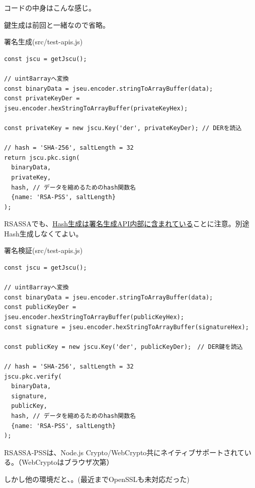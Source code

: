 \documentclass[12pt,dvipdfmx]{beamer}
\begin{document}
\begin{frame}[fragile]
コードの中身はこんな感じ。

鍵生成は前回と一緒なので省略。


\begin{block}{\small 署名生成(src/test-apis.js)}
\scriptsize
\begin{verbatim}
const jscu = getJscu();

// uint8arrayへ変換
const binaryData = jseu.encoder.stringToArrayBuffer(data);
const privateKeyDer = jseu.encoder.hexStringToArrayBuffer(privateKeyHex);

const privateKey = new jscu.Key('der', privateKeyDer); // DERを読込

// hash = 'SHA-256', saltLength = 32
return jscu.pkc.sign(
  binaryData,
  privateKey,
  hash, // データを縮めるためのhash関数名
  {name: 'RSA-PSS', saltLength}
);
\end{verbatim}
\end{block}
RSASSAでも、\underline{Hash生成は署名生成API内部に含まれている}ことに注意。別途Hash生成しなくてよい。
\end{frame}

\begin{frame}[fragile]

\begin{block}{\small 署名検証(src/test-apis.js)}
\scriptsize
\begin{verbatim}
const jscu = getJscu();

// uint8arrayへ変換
const binaryData = jseu.encoder.stringToArrayBuffer(data);
const publicKeyDer = jseu.encoder.hexStringToArrayBuffer(publicKeyHex);
const signature = jseu.encoder.hexStringToArrayBuffer(signatureHex);

const publicKey = new jscu.Key('der', publicKeyDer);　// DER鍵を読込

// hash = 'SHA-256', saltLength = 32
jscu.pkc.verify(
  binaryData,
  signature,
  publicKey,
  hash, // データを縮めるためのhash関数名
  {name: 'RSA-PSS', saltLength}
); 
\end{verbatim}
\end{block}

\end{frame}

\begin{frame}
RSASSA-PSSは、Node.js Crypto/WebCrypto共にネイティブサポートされている。（WebCryptoはブラウザ次第）

しかし他の環境だと、。(最近までOpenSSLも未対応だった)
\end{frame}
\end{document}
